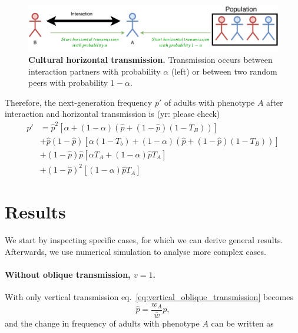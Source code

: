 \documentclass{article}
\begin{document}
\begin{figure}[h!]
  \centering
  \includegraphics[scale=1]{figure.pdf}
  \caption{\textbf{Cultural horizontal transmission.} Transmission occurs between interaction partners with probability $\alpha$ (left) or between two random peers with probability $1-\alpha$.}
  \label{fig:horizontal}
\end{figure}

Therefore, the next-generation frequency $p'$ of adults with phenotype $A$ after interaction and horizontal transmission is (yr: please check)
\begin{equation}\label{eq:horizontal}
\begin{aligned}
p'
& = \hat{p}^2 [\alpha + (1-\alpha)(\hat{p} + (1-\hat{p})(1-T_B))] \\
& + \hat{p}(1-\hat{p}) [\alpha(1-T_b) + (1-\alpha)(\hat{p} + (1-\hat{p})(1-T_B))] \\
& + (1-\hat{p})\hat{p} [\alpha T_A + (1-\alpha) \hat{p} T_A ] \\
& + (1-\hat{p})^2 [(1-\alpha) \hat{p} T_A]
\end{aligned}
\end{equation}

\section*{Results}

We start by inspecting specific cases, for which we can derive general results. 
Afterwards, we use numerical simulation to analyse more complex cases.

\paragraph*{Without oblique transmission, $v=1$.} 
With only vertical transmission eq.~\ref{eq:vertical_oblique_transmission} becomes
\begin{equation}
\hat{p} = \frac{w_A}{\bar{w}} p,
\end{equation}
and the change in frequency of adults with phenotype $A$ can be written as
\end{document}
